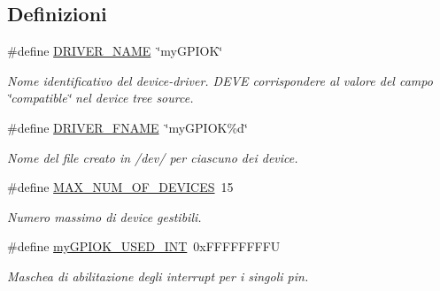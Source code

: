 \subsection*{Definizioni}
\begin{DoxyCompactItemize}
\item 
\#define \hyperlink{group___linux-_driver_ga25634d21648ca7fb7a2aca614bafaaeb}{D\+R\+I\+V\+E\+R\+\_\+\+N\+A\+M\+E}~\char`\"{}my\+G\+P\+I\+O\+K\char`\"{}
\begin{DoxyCompactList}\small\item\em Nome identificativo del device-\/driver. D\+E\+V\+E corrispondere al valore del campo \char`\"{}compatible\char`\"{} nel device tree source. \end{DoxyCompactList}\item 
\#define \hyperlink{group___linux-_driver_ga4fa7cb23649a4090e79e2610b7ba0a93}{D\+R\+I\+V\+E\+R\+\_\+\+F\+N\+A\+M\+E}~\char`\"{}my\+G\+P\+I\+O\+K\%d\char`\"{}
\begin{DoxyCompactList}\small\item\em Nome del file creato in /dev/ per ciascuno dei device. \end{DoxyCompactList}\item 
\#define \hyperlink{group___linux-_driver_gad32bf20eb64878cb958ca6ac9c96c21d}{M\+A\+X\+\_\+\+N\+U\+M\+\_\+\+O\+F\+\_\+\+D\+E\+V\+I\+C\+E\+S}~15
\begin{DoxyCompactList}\small\item\em Numero massimo di device gestibili. \end{DoxyCompactList}\item 
\#define \hyperlink{group___linux-_driver_ga78d3a23bb3381a43eaba8bbf8b1cc750}{my\+G\+P\+I\+O\+K\+\_\+\+U\+S\+E\+D\+\_\+\+I\+N\+T}~0x\+F\+F\+F\+F\+F\+F\+F\+F\+U
\begin{DoxyCompactList}\small\item\em Maschea di abilitazione degli interrupt per i singoli pin. \end{DoxyCompactList}\end{DoxyCompactItemize}
